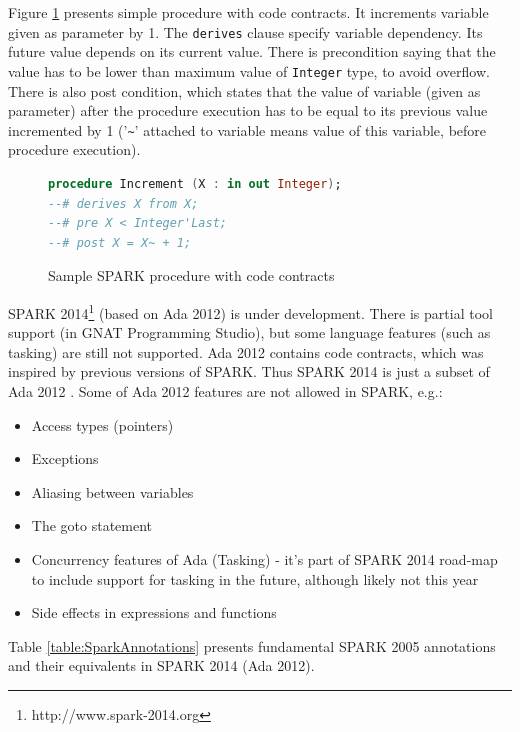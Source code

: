 Figure \ref{listing:SPARK2005Contracts} presents simple procedure with code contracts. It increments variable given as parameter by 1. The \lstinline{derives} clause specify variable dependency. Its future value depends on its current value. There is precondition saying that the value has to be lower than maximum value of \lstinline{Integer} type, to avoid overflow. There is also post condition, which states that the value of variable (given as parameter) after the procedure execution has to be equal to its previous value incremented by 1 ('\lstinline{~}' attached to variable means value of this variable, before procedure execution).

\begin{figure}
\singlespacing
\begin{lstlisting}[language=ada, frame=single, gobble=0]
procedure Increment (X : in out Integer);
--# derives X from X;
--# pre X < Integer'Last;
--# post X = X~ + 1;
\end{lstlisting} 
\doublespacing
\caption{Sample SPARK procedure with code contracts}
\label{listing:SPARK2005Contracts}
\end{figure}

SPARK 2014\footnote{http://www.spark-2014.org} (based on Ada 2012) is under development. There is partial tool support (in GNAT Programming Studio), but some language features (such as tasking) are still not supported. Ada 2012 contains code contracts, which was inspired by previous versions of SPARK. Thus SPARK 2014 is just a subset of Ada 2012 \cite{Spark2014:Paper}. Some of Ada 2012 features are not allowed in SPARK, e.g.:
\begin{itemize} \itemsep1pt \parskip0pt 
 	\item Access types (pointers)
 	\item Exceptions
	\item Aliasing between variables
	\item The goto statement
	\item Concurrency features of Ada (Tasking) - it's part of SPARK 2014 road-map to include support for tasking in the future, although likely not this year
	\item Side effects in expressions and functions
\end{itemize}

Table \ref{table:SparkAnnotations} presents fundamental SPARK 2005 annotations and their equivalents in SPARK 2014 (Ada 2012).

